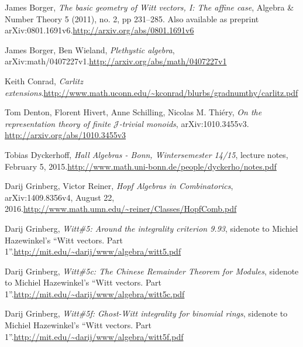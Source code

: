 \documentclass[numbers=enddot,12pt,final,onecolumn,notitlepage]{scrartcl}%
\theoremstyle{definition}
\begin{document}
\begin{thebibliography}{99}                                                                                               %


James Borger, \textit{The basic geometry of Witt vectors, I:
The affine case}, Algebra \& Number Theory 5 (2011), no. 2, pp 231--285. Also
available as preprint arXiv:0801.1691v6.\newline\url{http://arxiv.org/abs/0801.1691v6}

James Borger, Ben Wieland, \textit{Plethystic algebra},
arXiv:math/0407227v1.\newline\url{http://arxiv.org/abs/math/0407227v1}

Keith Conrad, \textit{Carlitz extensions}.\newline\url{http://www.math.uconn.edu/~kconrad/blurbs/gradnumthy/carlitz.pdf}

Tom Denton, Florent Hivert, Anne Schilling, Nicolas M.
Thi\'{e}ry, \textit{On the representation theory of finite }$\mathcal{J}%
$\textit{-trivial monoids}, arXiv:1010.3455v3. \url{http://arxiv.org/abs/1010.3455v3}

Tobias Dyckerhoff, \textit{Hall Algebras - Bonn,
Wintersemester 14/15}, lecture notes, February 5, 2015.\newline\url{http://www.math.uni-bonn.de/people/dyckerho/notes.pdf}

Darij Grinberg, Victor Reiner, \textit{Hopf Algebras in
Combinatorics}, arXiv:1409.8356v4, August 22, 2016.\newline\url{http://www.math.umn.edu/~reiner/Classes/HopfComb.pdf}

Darij Grinberg, \textit{Witt\#5: Around the integrality
criterion 9.93}, sidenote to Michiel Hazewinkel's \textquotedblleft Witt
vectors. Part 1\textquotedblright.\newline\url{http://mit.edu/~darij/www/algebra/witt5.pdf}

Darij Grinberg, \textit{Witt\#5c: The Chinese Remainder
Theorem for Modules}, sidenote to Michiel Hazewinkel's \textquotedblleft Witt
vectors. Part 1\textquotedblright.\newline\url{http://mit.edu/~darij/www/algebra/witt5c.pdf}

Darij Grinberg, \textit{Witt\#5f: Ghost-Witt integrality
for binomial rings}, sidenote to Michiel Hazewinkel's \textquotedblleft Witt
vectors. Part 1\textquotedblright.\newline\url{http://mit.edu/~darij/www/algebra/witt5f.pdf}


\end{thebibliography}
\end{document}
